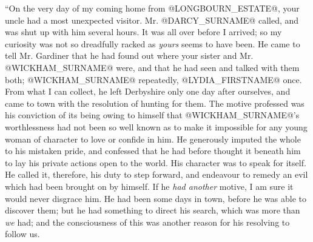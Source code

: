 ``On the very day of my coming home from @LONGBOURN_ESTATE@, your uncle had a most
unexpected visitor. Mr. @DARCY_SURNAME@ called, and was shut up with him several
hours. It was all over before I arrived; so my curiosity was not so
dreadfully racked as \textit{yours} seems to have been. He came to tell Mr.
Gardiner that he had found out where your sister and Mr. @WICKHAM_SURNAME@ were,
and that he had seen and talked with them both; @WICKHAM_SURNAME@ repeatedly,
@LYDIA_FIRSTNAME@ once. From what I can collect, he left Derbyshire only one day
after ourselves, and came to town with the resolution of hunting for
them. The motive professed was his conviction of its being owing to
himself that @WICKHAM_SURNAME@'s worthlessness had not been so well known as to
make it impossible for any young woman of character to love or confide
in him. He generously imputed the whole to his mistaken pride, and
confessed that he had before thought it beneath him to lay his private
actions open to the world. His character was to speak for itself. He
called it, therefore, his duty to step forward, and endeavour to remedy
an evil which had been brought on by himself. If he \textit{had another}
motive, I am sure it would never disgrace him. He had been some days
in town, before he was able to discover them; but he had something to
direct his search, which was more than \textit{we} had; and the consciousness
of this was another reason for his resolving to follow us.


